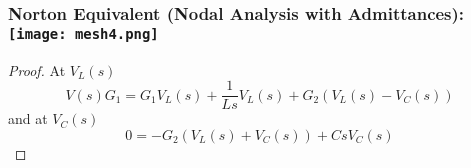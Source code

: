 \documentclass[11pt]{article}
\begin{document}
\subsubsection{Norton Equivalent (Nodal Analysis with Admittances): \newline \texttt{[image: mesh4.png]}}
\begin{proof}
	At $V_L(s)$
	\[V(s)G_1 = G_1V_L(s) + \frac{1}{Ls}V_L(s) + G_2(V_L(s) - V_C(s))\]
	and at $V_C(s)$
	\[0 = -G_2(V_L(s) + V_C(s)) + CsV_C(s)\]
\end{proof}
\end{document}
